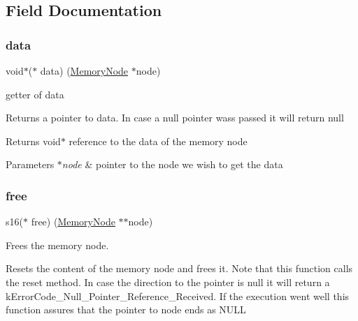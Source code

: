 \subsection{Field Documentation}
\mbox{\label{structmemory__node__ops__s_a36adf5dc8abc5a2cffb136827b5bbb75}} 
\subsubsection{\texorpdfstring{data}{data}}
{\footnotesize\ttfamily void$\ast$($\ast$ data) (\hyperlink{structmemory__node__s}{Memory\+Node} $\ast$node)}



getter of data 

Returns a pointer to data. In case a null pointer wass passed it will return null

\begin{DoxyReturn}{Returns}
void$\ast$ reference to the data of the memory node 
\end{DoxyReturn}

\begin{DoxyParams}{Parameters}
{\em $\ast$node} & pointer to the node we wish to get the data \\
\hline
\end{DoxyParams}
\mbox{\label{structmemory__node__ops__s_a0356db4d1c58d08229e1f5b02002bac2}} 
\subsubsection{\texorpdfstring{free}{free}}
{\footnotesize\ttfamily s16($\ast$ free) (\hyperlink{structmemory__node__s}{Memory\+Node} $\ast$$\ast$node)}



Frees the memory node. 

Resets the content of the memory node and frees it. Note that this function calls the reset method. In case the direction to the pointer is null it will return a k\+Error\+Code\+\_\+\+Null\+\_\+\+Pointer\+\_\+\+Reference\+\_\+\+Received. If the execution went well this function assures that the pointer to node ends as N\+U\+LL

